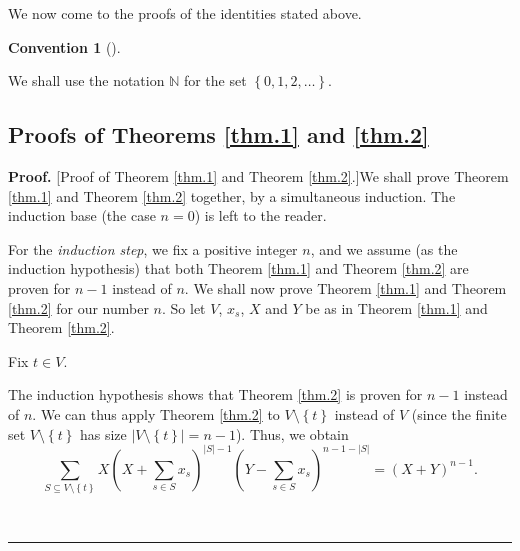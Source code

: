 \documentclass[numbers=enddot,12pt,final,onecolumn,notitlepage]{scrartcl}%
\theoremstyle{definition}
\newtheorem{conv}[theo]{Convention}
\newenvironment{convention}[1][]
{\begin{conv}[#1]\begin{leftbar}}
{\end{leftbar}\end{conv}}
\newenvironment{proof}[1][Proof]{\noindent\textbf{#1.} }{\ \rule{0.5em}{0.5em}}
\newenvironment{convention}[1][Convention]{\noindent\textbf{#1.} }{\ \rule{0.5em}{0.5em}}
\let\sumnonlimits\sum
\renewcommand{\sum}{\sumnonlimits\limits}
\newenvironment{vershort}{}{}
\begin{document}
We now come to the proofs of the identities stated above.

\begin{convention}
We shall use the notation $\mathbb{N}$ for the set $\left\{  0,1,2,\ldots
\right\}  $.
\end{convention}

\subsection{Proofs of Theorems \ref{thm.1} and \ref{thm.2}}

\begin{vershort}
\begin{proof}
[Proof of Theorem \ref{thm.1} and Theorem \ref{thm.2}.]We shall prove Theorem
\ref{thm.1} and Theorem \ref{thm.2} together, by a simultaneous induction. The
induction base (the case $n=0$) is left to the reader.

For the \textit{induction step}, we fix a positive integer $n$, and we assume
(as the induction hypothesis) that both Theorem \ref{thm.1} and Theorem
\ref{thm.2} are proven for $n-1$ instead of $n$. We shall now prove Theorem
\ref{thm.1} and Theorem \ref{thm.2} for our number $n$. So let $V$, $x_{s}$,
$X$ and $Y$ be as in Theorem \ref{thm.1} and Theorem \ref{thm.2}.

Fix $t\in V$.

The induction hypothesis shows that Theorem \ref{thm.2} is proven for $n-1$
instead of $n$. We can thus apply Theorem \ref{thm.2} to $V\setminus\left\{
t\right\}  $ instead of $V$ (since the finite set $V\setminus\left\{
t\right\}  $ has size $\left\vert V\setminus\left\{  t\right\}  \right\vert
=n-1$). Thus, we obtain%
\begin{equation}
\sum_{S\subseteq V\setminus\left\{  t\right\}  }X\left(  X+\sum_{s\in S}%
x_{s}\right)  ^{\left\vert S\right\vert -1}\left(  Y-\sum_{s\in S}%
x_{s}\right)  ^{n-1-\left\vert S\right\vert }=\left(  X+Y\right)  ^{n-1}.
\label{pf.thm.2.1}%
\end{equation}



\end{proof}
\end{vershort}
\end{document}
